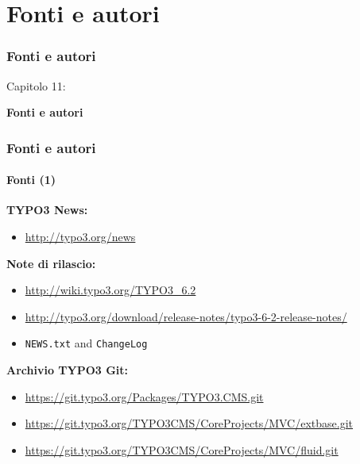 %

\section{Fonti e autori}
\begin{frame}[fragile]
	\frametitle{Fonti e autori}

	\begin{center}\huge{Capitolo 11:}\end{center}
	\begin{center}\huge{\color{typo3darkgrey}\textbf{Fonti e autori}}\end{center}

\end{frame}


\begin{frame}[fragile]
	\frametitle{Fonti e autori}
	\framesubtitle{Fonti (1)}

	\textbf{TYPO3 News:}
		\begin{itemize}\smaller
			\item \url{http://typo3.org/news}
		\end{itemize}

	\textbf{Note di rilascio:}
		\begin{itemize}\smaller
			\item \url{http://wiki.typo3.org/TYPO3_6.2}
			\item \url{http://typo3.org/download/release-notes/typo3-6-2-release-notes/}
			\item \texttt{NEWS.txt} and \texttt{ChangeLog}
		\end{itemize}

	\textbf{Archivio TYPO3 Git:}
		\begin{itemize}\smaller
			\item \url{https://git.typo3.org/Packages/TYPO3.CMS.git}
			\item \url{https://git.typo3.org/TYPO3CMS/CoreProjects/MVC/extbase.git}
			\item \url{https://git.typo3.org/TYPO3CMS/CoreProjects/MVC/fluid.git}
		\end{itemize}

\end{frame}

